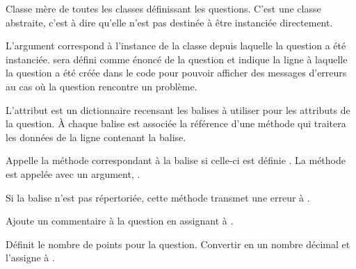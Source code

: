 \documentclass[a4paper,11pt,openany,oneside]{sphinxmanual}
\begin{document}
\begin{fulllineitems}
\label{front-end:QuestionAbstract}
Classe mère de toutes les classes définissant les questions. C'est une classe
abstraite, c'est à dire qu'elle n'est pas destinée à être instanciée directement.

L'argument  correspond à l'instance de la classe {\hyperref[front-end:Parse]{\emph{}}}
depuis laquelle la question a été instanciée.  sera défini comme énoncé
de la question et  indique la ligne à laquelle la question a été créée
dans le code pour pouvoir afficher des messages d'erreurs au cas où la question
rencontre un problème.

L'attribut  est un dictionnaire recensant les balises à utiliser
pour les attributs de la question. À chaque balise est associée la référence d'une méthode
qui traitera les données de la ligne contenant la balise.

\begin{fulllineitems}
\label{front-end:QuestionAbstract.add_attribute}
Appelle la méthode correspondant à la balise  si celle-ci est définie
. La méthode est appelée avec un argument, .

Si la balise n'est pas répertoriée, cette méthode transmet une erreur à
.

\end{fulllineitems}


\begin{fulllineitems}
\label{front-end:QuestionAbstract.add_comment}
Ajoute un commentaire à la question en assignant  à .

\end{fulllineitems}


\begin{fulllineitems}
\label{front-end:QuestionAbstract.add_points}
Définit le nombre de points pour la question. Convertir  en
un nombre décimal et l'assigne à .


\end{fulllineitems}
\end{fulllineitems}
\end{document}
